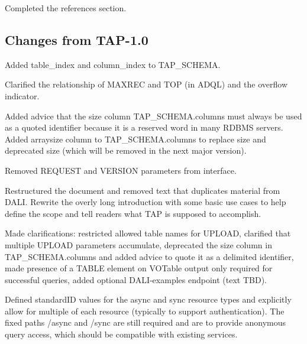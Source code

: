 \documentclass[11pt,letter]{ivoa}
\newcommand{\tapschema}{TAP\_SCHE\-MA}
\newcommand{\tapschema}{\mbox{%
  \relsize{-0.5}TAP\discretionary{-}{}{\kern-2pt\_}SCHEMA}}
\begin{document}
Completed the references section.

\subsection{Changes from TAP-1.0}

Added table\_index and column\_index to \tapschema.

Clarified the relationship of MAXREC and TOP (in ADQL) and the overflow 
indicator.

Added advice that the size column \tapschema.columns must always be used 
as a quoted identifier because it is a reserved word in many RDBMS 
servers. Added arraysize column to \tapschema.columns to replace size and 
deprecated size (which will be removed in the next major version).
 
Removed REQUEST and VERSION parameters from interface.

Restructured the document and removed text that duplicates material from DALI. 
Rewrite the overly long introduction with some basic use cases to help define 
the scope and tell readers what TAP is supposed to accomplish.

Made clarifications: restricted allowed table names for UPLOAD, clarified that 
multiple UPLOAD parameters accumulate, deprecated the size column in 
\tapschema.columns and added advice to quote it as a delimited 
identifier, made presence of a TABLE element on VOTable output only required for 
successful queries, added optional DALI-examples endpoint (text TBD).

Defined standardID values for the async and sync resource types and explicitly 
allow for multiple of each resource (typically to support authentication). The 
fixed paths /async and /sync are still required and are to provide anonymous 
query access, which should be compatible with existing services.



\end{document}
